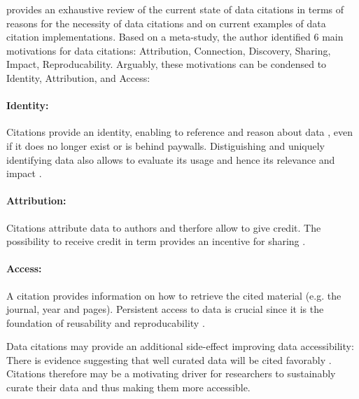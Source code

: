 \documentclass[letterpaper, twocolumn, parskip=half, fontsize=8pt, DIV=calc]{scrartcl}
\begin{document}
\cite{Silvello2017} provides an exhaustive review of the current state of data citations in terms of reasons for the necessity of data citations and on current examples of data citation implementations. Based on a meta-study, the author identified 6 main motivations for data citations: Attribution, Connection, Discovery, Sharing, Impact, Reproducability. 
Arguably, these motivations can be condensed to Identity, Attribution, and Access: 

\paragraph{Identity:} 
Citations provide an identity, enabling to reference and reason about data \citep{Bandrowski2016}, even if it does no longer exist or is behind paywalls. 
Distiguishing and uniquely identifying data also allows to evaluate its usage and hence its relevance and impact \citep{Honor2016}.

\paragraph{Attribution:}
Citations attribute data to authors and therfore allow to give credit.
The possibility to receive credit in term provides an incentive for sharing \citep{Niemeyer2016, Callaghan2012, Kratz2014}. 



\paragraph{Access:} 
A citation provides information on how to retrieve the cited material (e.g. the journal, year and pages). Persistent access to data is crucial since it is the foundation of reusability and reproducability \citep{Starr2015}. 

Data citations may provide an additional side-effect improving data accessibility: There is evidence suggesting that well curated data will be cited favorably \citep{Belter2014}. Citations therefore may be a motivating driver for researchers to sustainably curate their data and thus making them more accessible.
\end{document}
